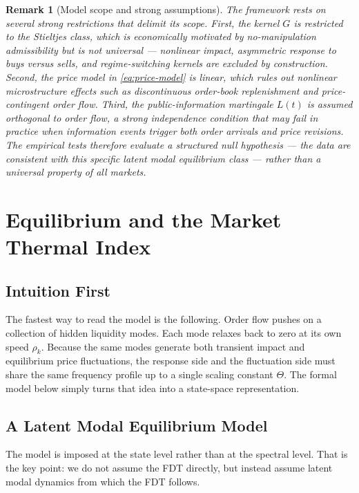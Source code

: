 \documentclass[11pt]{article}
\newtheorem{remark}[theorem]{Remark}
\newcommand{\REV}{}
\begin{document}
\begin{remark}[Model scope and strong assumptions]
The framework rests on several strong restrictions that delimit its scope. First, the kernel $G$ is restricted to the Stieltjes class, which is economically motivated by no-manipulation admissibility but is not universal --- nonlinear impact, asymmetric response to buys versus sells, and regime-switching kernels are excluded by construction. Second, the price model in \cref{eq:price-model} is linear, which rules out nonlinear microstructure effects such as discontinuous order-book replenishment and price-contingent order flow. Third, the public-information martingale $L(t)$ is assumed orthogonal to order flow, a strong independence condition that may fail in practice when information events trigger both order arrivals and price revisions. The empirical tests therefore evaluate a structured null hypothesis --- the data are consistent with this specific latent modal equilibrium class --- rather than a universal property of all markets.
\end{remark}

\section{Equilibrium and the Market Thermal Index}\label{sec:equilibrium}

\subsection{Intuition First}
The fastest way to read the model is the following. Order flow pushes on a collection of hidden liquidity modes. Each mode relaxes back to zero at its own speed $\rho_k$. Because the same modes generate both transient impact and equilibrium price fluctuations, the response side and the fluctuation side must share the same frequency profile up to a single scaling constant $\Theta$. The formal model below simply turns that idea into a state-space representation.

\subsection{A Latent Modal Equilibrium Model}
\REV
The model is imposed at the state level rather than at the spectral level. That is the key point: we do not assume the FDT directly, but instead assume latent modal dynamics from which the FDT follows.
\end{document}
